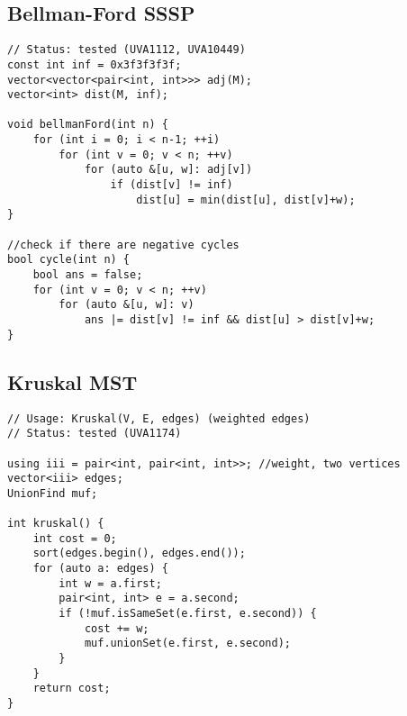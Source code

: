 \documentclass[12pt, a4paper, twoside]{article}
\begin{document}
\subsection{Bellman-Ford SSSP}
\begin{lstlisting}
// Status: tested (UVA1112, UVA10449)
const int inf = 0x3f3f3f3f;
vector<vector<pair<int, int>>> adj(M);
vector<int> dist(M, inf);

void bellmanFord(int n) {
	for (int i = 0; i < n-1; ++i)
		for (int v = 0; v < n; ++v)
			for (auto &[u, w]: adj[v])
				if (dist[v] != inf)
					dist[u] = min(dist[u], dist[v]+w);
}

//check if there are negative cycles
bool cycle(int n) {
	bool ans = false;
	for (int v = 0; v < n; ++v)
		for (auto &[u, w]: v)
			ans |= dist[v] != inf && dist[u] > dist[v]+w;
}
\end{lstlisting}

\subsection{Kruskal MST}
\begin{lstlisting}
// Usage: Kruskal(V, E, edges) (weighted edges)
// Status: tested (UVA1174)

using iii = pair<int, pair<int, int>>; //weight, two vertices
vector<iii> edges;
UnionFind muf;

int kruskal() {
	int cost = 0;
	sort(edges.begin(), edges.end());
	for (auto a: edges) {
		int w = a.first;
		pair<int, int> e = a.second;
		if (!muf.isSameSet(e.first, e.second)) {
			cost += w;
			muf.unionSet(e.first, e.second);
		}
	}
	return cost;
}
\end{lstlisting}
\end{document}
